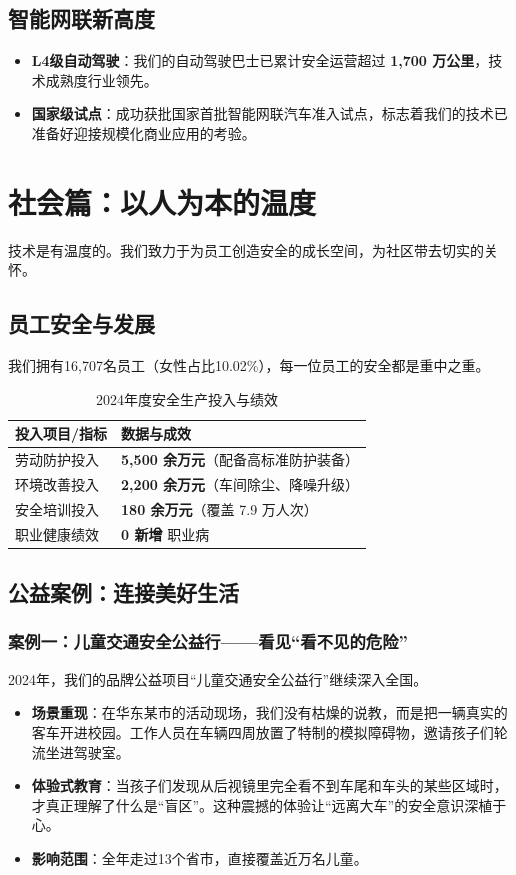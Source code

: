 \documentclass[a4paper,12pt]{article}
\begin{document}
\subsection{智能网联新高度}
\begin{itemize}
    \item \textbf{L4级自动驾驶}：我们的自动驾驶巴士已累计安全运营超过 \textbf{1,700 万公里}，技术成熟度行业领先。
    \item \textbf{国家级试点}：成功获批国家首批智能网联汽车准入试点，标志着我们的技术已准备好迎接规模化商业应用的考验。
\end{itemize}

\section{社会篇：以人为本的温度}

技术是有温度的。我们致力于为员工创造安全的成长空间，为社区带去切实的关怀。

\subsection{员工安全与发展}
我们拥有16,707名员工（女性占比10.02\%），每一位员工的安全都是重中之重。
\begin{table}[h]
\centering
\caption{2024年度安全生产投入与绩效}
\begin{tabular}{l l}
\toprule
\textbf{投入项目/指标} & \textbf{数据与成效} \\
\midrule
劳动防护投入 & \textbf{5,500 余万元}（配备高标准防护装备） \\
环境改善投入 & \textbf{2,200 余万元}（车间除尘、降噪升级） \\
安全培训投入 & \textbf{180 余万元}（覆盖 7.9 万人次） \\
职业健康绩效 & \textbf{0 新增} 职业病 \\
\bottomrule
\end{tabular}
\end{table}

\subsection{公益案例：连接美好生活}

\subsubsection{案例一：儿童交通安全公益行——看见“看不见的危险”}
2024年，我们的品牌公益项目“儿童交通安全公益行”继续深入全国。
\begin{itemize}
    \item \textbf{场景重现}：在华东某市的活动现场，我们没有枯燥的说教，而是把一辆真实的客车开进校园。工作人员在车辆四周放置了特制的模拟障碍物，邀请孩子们轮流坐进驾驶室。
    \item \textbf{体验式教育}：当孩子们发现从后视镜里完全看不到车尾和车头的某些区域时，才真正理解了什么是“盲区”。这种震撼的体验让“远离大车”的安全意识深植于心。
    \item \textbf{影响范围}：全年走过13个省市，直接覆盖近万名儿童。
\end{itemize}
\end{document}
